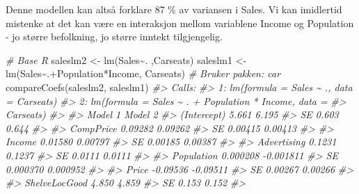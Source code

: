 \documentclass[
]{article}
\newenvironment{Shaded}{\begin{snugshade}}{\end{snugshade}}
\newcommand{\CommentTok}[1]{\textcolor[rgb]{0.56,0.35,0.01}{\textit{#1}}}
\newcommand{\FunctionTok}[1]{\textcolor[rgb]{0.00,0.00,0.00}{#1}}
\newcommand{\NormalTok}[1]{#1}
\newcommand{\OtherTok}[1]{\textcolor[rgb]{0.56,0.35,0.01}{#1}}
\newcommand{\SpecialCharTok}[1]{\textcolor[rgb]{0.00,0.00,0.00}{#1}}
\begin{document}
Denne modellen kan altså forklare 87 \% av variansen i Sales.
Vi kan imidlertid mistenke at det kan være en interaksjon mellom variablene Income og Population - jo større befolkning, jo større inntekt tilgjengelig.

\begin{Shaded}
\begin{Highlighting}[]
\CommentTok{\# Base R}
\NormalTok{saleslm2 }\OtherTok{\textless{}{-}} \FunctionTok{lm}\NormalTok{(Sales}\SpecialCharTok{\textasciitilde{}}\NormalTok{. ,Carseats)}
\NormalTok{saleslm1 }\OtherTok{\textless{}{-}} \FunctionTok{lm}\NormalTok{(Sales}\SpecialCharTok{\textasciitilde{}}\NormalTok{.}\SpecialCharTok{+}\NormalTok{Population}\SpecialCharTok{*}\NormalTok{Income, Carseats)}
\CommentTok{\# Bruker pakken: car}
\FunctionTok{compareCoefs}\NormalTok{(saleslm2, saleslm1)}
\CommentTok{\#\textgreater{} Calls:}
\CommentTok{\#\textgreater{} 1: lm(formula = Sales \textasciitilde{} ., data = Carseats)}
\CommentTok{\#\textgreater{} 2: lm(formula = Sales \textasciitilde{} . + Population * Income, data = }
\CommentTok{\#\textgreater{}   Carseats)}
\CommentTok{\#\textgreater{} }
\CommentTok{\#\textgreater{}                     Model 1   Model 2}
\CommentTok{\#\textgreater{} (Intercept)           5.661     6.195}
\CommentTok{\#\textgreater{} SE                    0.603     0.644}
\CommentTok{\#\textgreater{}                                      }
\CommentTok{\#\textgreater{} CompPrice           0.09282   0.09262}
\CommentTok{\#\textgreater{} SE                  0.00415   0.00413}
\CommentTok{\#\textgreater{}                                      }
\CommentTok{\#\textgreater{} Income              0.01580   0.00797}
\CommentTok{\#\textgreater{} SE                  0.00185   0.00387}
\CommentTok{\#\textgreater{}                                      }
\CommentTok{\#\textgreater{} Advertising          0.1231    0.1237}
\CommentTok{\#\textgreater{} SE                   0.0111    0.0111}
\CommentTok{\#\textgreater{}                                      }
\CommentTok{\#\textgreater{} Population         0.000208 {-}0.001811}
\CommentTok{\#\textgreater{} SE                 0.000370  0.000952}
\CommentTok{\#\textgreater{}                                      }
\CommentTok{\#\textgreater{} Price              {-}0.09536  {-}0.09511}
\CommentTok{\#\textgreater{} SE                  0.00267   0.00266}
\CommentTok{\#\textgreater{}                                      }
\CommentTok{\#\textgreater{} ShelveLocGood         4.850     4.859}
\CommentTok{\#\textgreater{} SE                    0.153     0.152}
\CommentTok{\#\textgreater{}                                      }

\end{Highlighting}
\end{Shaded}
\end{document}
